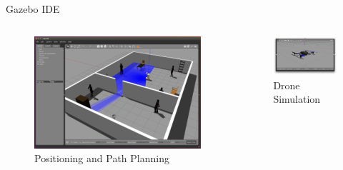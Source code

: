 \documentclass[11pt,t,usepdftitle=false,aspectratio=169]{beamer}
\begin{document}
\begin{frame}{Gazebo IDE}
   
   \begin{columns}[c]
      \begin{column}{.5\textwidth}
         \begin{figure}
            \includegraphics{images/gazebo_ex1.png}
            \caption{Positioning and Path Planning}
         \end{figure}
      \end{column}
      \begin{column}{.5\textwidth}
         \begin{figure}
            \includegraphics{images/gazebo_ex2.jpeg}
            \caption{Drone Simulation}
         \end{figure}
      \end{column}
   \end{columns}
\end{frame}
\end{document}
